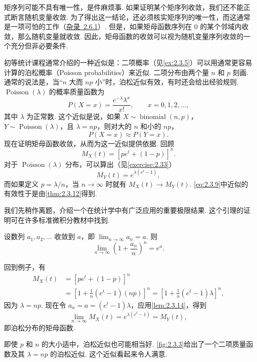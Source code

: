 矩序列可能不具有唯一性，是件麻烦事. 如果证明某个矩序列收敛，我们还不能正式断言随机变量收敛. 为了得出这一结论，还必须核实矩序列的唯一性，而这通常是一项可怕的工作（\hyperref[sec:2.6.1]{杂录~2.6.1}）. 但是，如果矩母函数序列在 $0$ 的某个邻域内收敛，那么随机变量就收敛. 因此，矩母函数的收敛可以视为随机变量序列收敛的一个充分但非必要条件.

\begin{example}[泊松近似]\label{ex:2.3.13}
初等统计课程通常介绍的一种近似是：二项概率（见\autoref{ex:2.3.5}）可以用通常更容易计算的泊松概率（Poisson probabilities）来近似. 二项分布由两个量 $n$ 和 $p$ 刻画. 通常的说法是，当“$n$ 大而 $np$ 小”时，泊松近似有效，有时还会给出经验规则.
$\operatorname{Poisson}(\lambda)$ 的概率质量函数为
$$P(X=x)=\frac{e^{-\lambda}\lambda^x}{x!},\qquad x=0,1,2,\ldots,$$
其中 $\lambda$ 为正常数. 这个近似是说，如果 $X\sim\operatorname{binomial}(n,p)$，$Y\sim\operatorname{Poisson}(\lambda)$，且 $\lambda=np$，则对大的 $n$ 和小的 $np$，
\begin{equation}\label{eq:2.3.9}
P(X=x)\approx P(Y=x).
\end{equation}
现在证明矩母函数收敛，从而为这一近似提供依据. 回顾
\begin{equation}\label{eq:2.3.10}
M_X(t)=[pe^t+(1-p)]^n.
\end{equation}
对于 $\operatorname{Poisson}(\lambda)$ 分布，可以算出（见\autoref{exercise:2.33}）
$$M_Y(t)=e^{\lambda(e^t-1)},$$
而如果定义 $p=\lambda/n$，当 $n\to\infty$ 时就有 $M_X(t)\to M_Y(t)$. \eqref{eq:2.3.9}中近似的有效性于是由\autoref{thm:2.3.12}得到.

我们先稍作离题，介绍一个在统计学中有广泛应用的重要极限结果. 这个引理的证明可在许多标准微积分教材中找到.
\begin{lemma}\label{lem:2.3.14}
设数列 $a_1,a_2,\ldots$ 收敛到 $a$，即 $\lim_{n\to\infty}a_n=a$. 则
$$\lim_{n\to\infty}\left(1+\frac{a_n}n\right)^n=e^a.$$
\end{lemma}
回到例子，有
$$\begin{aligned}
M_X(t)&=[pe^t+(1-p)]^n\\
&=\left[1+\frac1n(e^t-1)(np)\right]^n
=\left[1+\frac1n(e^t-1)\lambda\right]^n,
\end{aligned}$$
因为 $\lambda=np$. 现在令 $a_n=a=(e^t-1)\lambda$，应用\autoref{lem:2.3.14}，得到
$$\lim_{n\to\infty}M_X(t)=e^{\lambda(e^t-1)}=M_Y(t),$$
即泊松分布的矩母函数.

即使 $p$ 和 $n$ 的大小适中，泊松近似也可能相当好. \autoref{fig:2.3.3}给出了一个二项质量函数及其 $\lambda=np$ 的泊松近似. 这个近似看起来令人满意.
\end{example}

